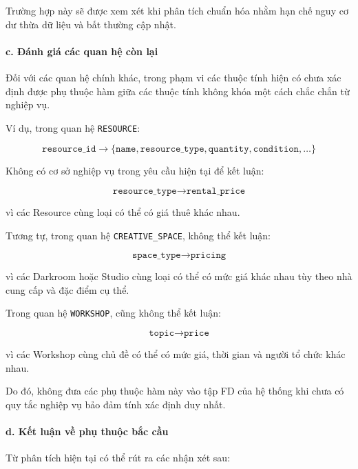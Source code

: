 Trường hợp này sẽ được xem xét khi phân tích chuẩn hóa nhằm hạn chế nguy cơ dư thừa dữ liệu và bất thường cập nhật.

\paragraph{c. Đánh giá các quan hệ còn lại}\mbox{}\par

Đối với các quan hệ chính khác, trong phạm vi các thuộc tính hiện có chưa xác định được phụ thuộc hàm giữa các thuộc tính không khóa một cách chắc chắn từ nghiệp vụ.

Ví dụ, trong quan hệ \texttt{RESOURCE}:

$$
\texttt{resource\_id}
\rightarrow
\{
\texttt{name},
\texttt{resource\_type},
\texttt{quantity},
\texttt{condition},
\ldots
\}
$$

Không có cơ sở nghiệp vụ trong yêu cầu hiện tại để kết luận:

$$
\texttt{resource\_type}
\rightarrow
\texttt{rental\_price}
$$

vì các Resource cùng loại có thể có giá thuê khác nhau.

Tương tự, trong quan hệ \texttt{CREATIVE\_SPACE}, không thể kết luận:

$$
\texttt{space\_type}
\rightarrow
\texttt{pricing}
$$

vì các Darkroom hoặc Studio cùng loại có thể có mức giá khác nhau tùy theo nhà cung cấp và đặc điểm cụ thể.

Trong quan hệ \texttt{WORKSHOP}, cũng không thể kết luận:

$$
\texttt{topic}
\rightarrow
\texttt{price}
$$

vì các Workshop cùng chủ đề có thể có mức giá, thời gian và người tổ chức khác nhau.

Do đó, không đưa các phụ thuộc hàm này vào tập FD của hệ thống khi chưa có quy tắc nghiệp vụ bảo đảm tính xác định duy nhất.

\paragraph{d. Kết luận về phụ thuộc bắc cầu}\mbox{}\par

Từ phân tích hiện tại có thể rút ra các nhận xét sau:

